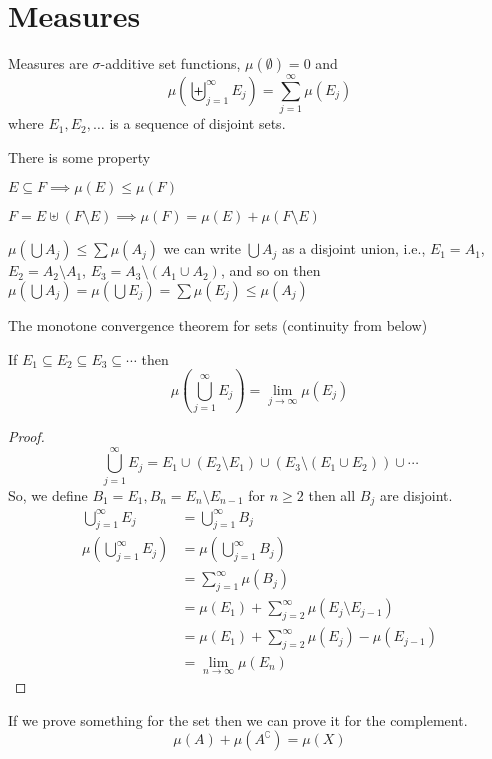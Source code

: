 \section{Measures}

\begin{definition}
Measures are $\sigma$-additive set functions, $\mu(\emptyset) = 0$ and
\[\mu\left(\biguplus_{j=1}^\infty E_j\right) = \sum_{j=1}^\infty \mu(E_j)\]
where $E_1, E_2, \dotsc$ is a sequence of disjoint sets.
\end{definition}

\begin{remark}
There is some property   

$E \subseteq F \implies \mu(E) \leq \mu(F)$ 

$F = E \uplus (F \setminus E) \implies \mu(F) = \mu(E) + \mu(F \setminus E)$

$\mu(\bigcup A_j) \leq \sum \mu(A_j)$
we can write $\bigcup A_j$ as a disjoint union, i.e.,
$E_1 = A_1$, $E_2 = A_2 \setminus A_1$, $E_3 = A_3 \setminus (A_1 \cup A_2)$, and so on then
$\mu(\bigcup A_j) = \mu(\bigcup E_j) = \sum \mu(E_j) \leq \mu(A_j)$
\end{remark}

The monotone convergence theorem for sets (continuity from below)

\begin{theorem}
  
If $E_1 \subseteq E_2 \subseteq E_3 \subseteq \dotsm$ then
\[\mu\left(\bigcup_{j=1}^\infty E_j\right) = \lim_{j\to\infty} \mu(E_j)\]
\end{theorem}

\begin{proof}
$$\bigcup_{j=1}^\infty E_j = E_1 \cup (E_2 \setminus E_1) \cup (E_3 \setminus (E_1 \cup E_2)) \cup \dotsm$$
So, we define $B_1 = E_1, B_n = E_n \setminus E_{n-1}$ for $n \ge 2$ then all $B_j$ are disjoint.
\begin{align*}
  \bigcup_{j=1}^\infty E_j &= \bigcup_{j=1}^\infty B_j \\
  \mu\left(\bigcup_{j=1}^\infty E_j\right)&= \mu\left(\bigcup_{j=1}^\infty B_j\right) \\
  &= \sum_{j=1}^\infty \mu(B_j) \\
  &= \mu(E_1) + \sum_{j=2}^\infty \mu(E_j \setminus E_{j-1}) \\
  &= \mu(E_1) + \sum_{j=2}^\infty \mu(E_j) - \mu(E_{j-1}) \\
  &= \lim_{n\to\infty} \mu(E_n)
\end{align*}
\end{proof}
\begin{remark}
  If we prove something for the set then we can prove it for the complement.
  \[\mu(A) + \mu(A^\complement) = \mu(X)\]
\end{remark}

